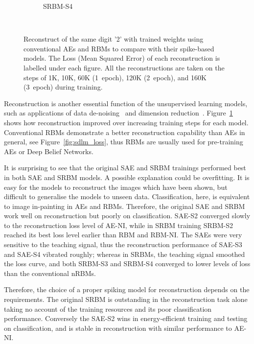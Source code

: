 \begin{figure}
\begin{subfigure}[t]{0.32\textwidth}
		\caption{SRBM-S4}
	\end{subfigure}\\
	\caption{Reconstruct of the same digit '2' with trained weights using conventional AEs and RBMs to compare with their spike-based models.
		The Loss (Mean Squared Error) of each reconstruction is labelled under each figure.
		All the reconstructions are taken on the steps of 1K, 10K, 60K (1~epoch), 120K (2~epoch), and 160K (3~epoch) during training.}
	\label{fig:sdlm_recon}
\end{figure}

Reconstruction is another essential function of the unsupervised learning models, such as applications of data de-noising~\citep{xie2012image} and dimension reduction~\citep{hinton2006fast}.
Figure~\ref{fig:sdlm_recon} shows how reconstruction improved over increasing training steps for each model.
Conventional RBMs demonstrate a better reconstruction capability than AEs in general, see Figure~\ref{fig:sdlm_loss}, thus RBMs are usually used for pre-training AEs or Deep Belief Networks.

It is surprising to see that the original SAE and SRBM trainings performed best in both SAE and SRBM models.
A possible explanation could be overfitting.
It is easy for the models to reconstruct the images which have been shown, but difficult to generalise the models to unseen data.
Classification, here, is equivalent to image in-painting in AEs and RBMs.
Therefore, the original SAE and SRBM work well on reconstruction but poorly on classification.
SAE-S2 converged slowly to the reconstruction loss level of AE-NI, while in SRBM training SRBM-S2 reached its best loss level earlier than RBM and RBM-NI.
The SAEs were very sensitive to the teaching signal, thus the reconstruction performance of SAE-S3 and SAE-S4 vibrated roughly; 
whereas in SRBMs, the teaching signal smoothed the loss curve, and both SRBM-S3 and SRBM-S4 converged to lower levels of loss than the conventional nRBMs.

Therefore, the choice of a proper spiking model for reconstruction depends on the requirements.
The original SRBM is outstanding in the reconstruction task alone taking no account of the training resources and its poor classification performance.
Conversely the SAE-S2 wins in energy-efficient training and testing on classification, and is stable in reconstruction with similar performance to AE-NI.


